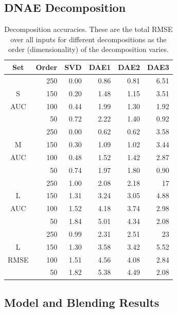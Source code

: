 \documentclass{article}
\begin{document}
\subsection{DNAE Decomposition}

\begin{table}[t]
\caption{Decomposition accuracies.  These are the total RMSE over all inputs for different decompositions as the order (dimensionality) of the decomposition varies.}
\label{table:dnae-decomposition-accuracy}
\vskip 0.15in
\begin{center}
\begin{small}
\begin{sc}
\begin{tabular}{crrrrr}
\hline
\abovespace\belowspace
Set & Order & SVD & DAE1 & DAE2 & DAE3 \\
\hline
\abovespace
     & 250 & 0.00 & 0.86 & 0.81 & 6.51 \\
S    & 150 & 0.20 & 1.48 & 1.15 & 3.51 \\
AUC  & 100 & 0.44 & 1.99 & 1.30 & 1.92 \\
     &  50 & 0.72 & 2.22 & 1.40 & 0.92 \\
\abovespace
     & 250 & 0.00 & 0.62 & 0.62 & 3.58 \\
M    & 150 & 0.30 & 1.09 & 1.02 & 3.44 \\
AUC  & 100 & 0.48 & 1.52 & 1.42 & 2.87 \\
     &  50 & 0.74 & 1.97 & 1.80 & 0.90 \\
\abovespace
     & 250 & 1.00 & 2.08 & 2.18 & 17 \\
L    & 150 & 1.31 & 3.24 & 3.05 & 4.88 \\
AUC  & 100 & 1.52 & 4.18 & 3.74 & 2.98 \\
     &  50 & 1.84 & 5.01 & 4.34 & 2.08 \\
\abovespace
     & 250 & 0.99 & 2.31 & 2.51 & 23 \\
L    & 150 & 1.30 & 3.58 & 3.42 & 5.52 \\
RMSE & 100 & 1.51 & 4.56 & 4.08 & 2.84 \\
\belowspace
     &  50 & 1.82 & 5.38 & 4.49 & 2.08 \\
\hline
\end{tabular}
\end{sc}
\end{small}
\end{center}
\vskip -0.1in
\end{table}


\subsection{Model and Blending Results}
\end{document}

